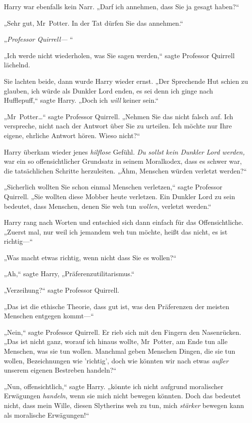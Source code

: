{Harry war ebenfalls kein Narr. „Darf ich annehmen, dass Sie ja gesagt haben?“

„Sehr gut, Mr~Potter. In der Tat dürfen Sie das annehmen.“

„\emph{Professor Quirrell—} “

„Ich werde nicht wiederholen, was Sie sagen werden,“ sagte Professor Quirrell lächelnd.

Sie lachten beide, dann wurde Harry wieder ernst. „Der Sprechende Hut schien zu glauben, ich würde als Dunkler Lord enden, es sei denn ich ginge nach Hufflepuff,“ sagte Harry. „Doch ich \emph{will} keiner sein.“

„Mr~Potter…“ sagte Professor Quirrell. „Nehmen Sie das nicht falsch auf. Ich verspreche, nicht nach der Antwort über Sie zu urteilen. Ich möchte nur Ihre eigene, ehrliche Antwort hören. Wieso nicht?“

Harry überkam wieder jenes \emph{hilflose} Gefühl. \emph{Du sollst kein Dunkler Lord werden,} war ein so offensichtlicher Grundsatz in seinem Moralkodex, dass es schwer war, die tatsächlichen Schritte herzuleiten. „Ähm, Menschen würden verletzt werden?“

„Sicherlich wollten Sie schon einmal Menschen verletzen,“ sagte Professor Quirrell. „Sie wollten diese Mobber heute verletzen. Ein Dunkler Lord zu sein bedeutet, dass Menschen, denen Sie weh tun \emph{wollen}, verletzt werden.“

Harry rang nach Worten und entschied sich dann einfach für das Offensichtliche. „Zuerst mal, nur weil ich jemandem weh tun möchte, heißt das nicht, es ist richtig—“

„Was macht etwas richtig, wenn nicht dass Sie es wollen?“

„Ah,“ sagte Harry, „Präferenzutilitarismus.“

„Verzeihung?“ sagte Professor Quirrell.

„Das ist die ethische Theorie, dass gut ist, was den Präferenzen der meisten Menschen entgegen kommt—“

„Nein,“ sagte Professor Quirrell. Er rieb sich mit den Fingern den Nasenrücken. „Das ist nicht ganz, worauf ich hinaus wollte, Mr~Potter, am Ende tun alle Menschen, was sie tun wollen. Manchmal geben Menschen Dingen, die sie tun wollen, Bezeichnungen wie 'richtig', doch wie könnten wir nach etwas \emph{außer} unserem eigenen Bestreben handeln?“

„Nun, offensichtlich,“ sagte Harry. „könnte ich nicht aufgrund moralischer Erwägungen \emph{handeln}, wenn sie mich nicht bewegen könnten. Doch das bedeutet nicht, dass mein Wille, diesen Slytherins weh zu tun, mich \emph{stärker} bewegen kann als moralische Erwägungen!“

}
